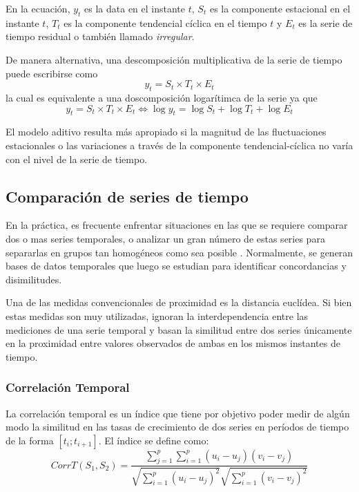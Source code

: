      En la ecuación,  $y_t$ es la data en el instante $t$, $S_t$ es la componente estacional en el instante $t$, $T_t$ es la componente tendencial cíclica en el tiempo $t$
     y $E_t$ es la serie de tiempo residual o también llamado \textit{irregular}\cite{20}.

     De manera alternativa, una descomposición multiplicativa de la serie de tiempo puede escribirse como
     \begin{equation}
        y_t = S_t 
        \times T_t 
        \times E_t
     \end{equation}
     la cual es equivalente a una doscomposición logarítimca de la serie ya que 
     \begin{equation*}
        y_t = S_t 
        \times T_t 
        \times E_t
        \iff
        \log y_t =  \log S_t +
        \log T_t +
        \log E_t
     \end{equation*}

     El modelo aditivo resulta más apropiado si la magnitud de las fluctuaciones estacionales o las variaciones
     a través de la componente tendencial-cíclica no varía con el nivel de la serie de tiempo.


     \subsection{Comparación de series de tiempo}
     En la práctica, es frecuente enfrentar situaciones
     en las que se requiere comparar dos o mas series temporales, o analizar un gran
     número de estas series para separarlas en grupos tan homogéneos como sea posible \cite{27}.
     Normalmente, se generan bases de datos temporales que luego se estudian para identificar concordancias y disimilitudes.    

     Una de las medidas convencionales de proximidad es la distancia euclídea. Si bien estas medidas son muy utilizadas, ignoran la interdependencia entre
     las mediciones de una serie temporal y basan la similitud entre dos series únicamente en la proximidad entre valores observados de ambas en los mismos instantes de
     tiempo\cite{27}.
     \subsubsection{Correlación Temporal}
     La correlación temporal es un índice que tiene por objetivo poder medir de algún modo la similitud en las tasas de crecimiento de dos series en períodos de
     tiempo de la forma $[t_i; t_{i+1}]$. El índice se define como:
     \begin{equation}\label{eqn:cort}
        CorrT(S_1,S_2) = \frac{\sum_{j=1}^p\sum_{i=1}^p(u_i-u_j)(v_i-v_j)} {\sqrt{\sum_{i=1}^p(u_i-u_j)^2}\sqrt{\sum_{i=1}^p(v_i-v_j)^2}}
     \end{equation}

